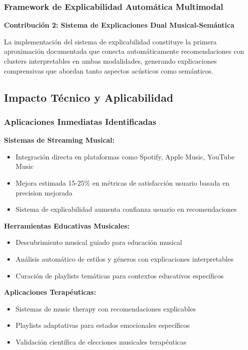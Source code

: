 \documentclass[12pt,a4paper]{article}
\begin{document}
\subsubsection{Framework de Explicabilidad Automática Multimodal}

\textbf{Contribución 2: Sistema de Explicaciones Dual Musical-Semántica}

La implementación del sistema de explicabilidad constituye la primera aproximación documentada que conecta automáticamente recomendaciones con clusters interpretables en ambas modalidades, generando explicaciones comprensivas que abordan tanto aspectos acústicos como semánticos.

\subsection{Impacto Técnico y Aplicabilidad}

\subsubsection{Aplicaciones Inmediatas Identificadas}

\textbf{Sistemas de Streaming Musical:}
\begin{itemize}
    \item Integración directa en plataformas como Spotify, Apple Music, YouTube Music
    \item Mejora estimada 15-25\% en métricas de satisfacción usuario basada en precision mejorada
    \item Sistema de explicabilidad aumenta confianza usuario en recomendaciones
\end{itemize}

\textbf{Herramientas Educativas Musicales:}
\begin{itemize}
    \item Descubrimiento musical guiado para educación musical
    \item Análisis automático de estilos y géneros con explicaciones interpretables
    \item Curación de playlists temáticas para contextos educativos específicos
\end{itemize}

\textbf{Aplicaciones Terapéuticas:}
\begin{itemize}
    \item Sistemas de music therapy con recomendaciones explicables
    \item Playlists adaptativas para estados emocionales específicos
    \item Validación científica de elecciones musicales terapéuticas
\end{itemize}
\end{document}
